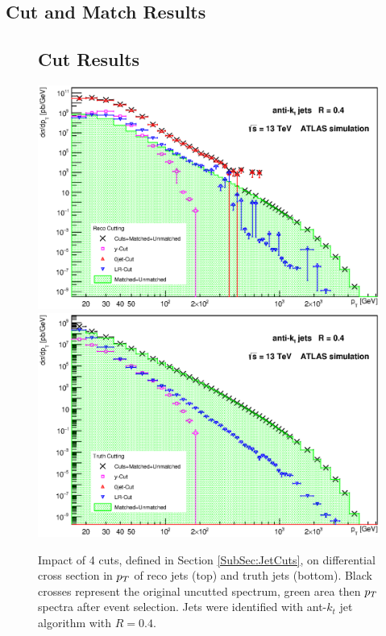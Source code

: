 \begin{appendices}

\chapter{Cut and Match Results}
\label{App:CutAndMatchingResults}

\newpage 

\begin{figure}[p]
\section{Cut Results}
\label{sec:CutResults}
  \centering
  \includegraphics[width=\textwidth]{Chapter3/SignalCutting.eps}
  \includegraphics[width=\textwidth]{Chapter3/TruthCutting.eps}
  \caption{Impact of 4 cuts, defined in Section \ref{SubSec:JetCuts}, on
  differential cross section in $p_{T}$ of reco jets (top) and truth jets
  (bottom). Black crosses represent the original uncutted spectrum, green area then
  $p_{T}$ spectra after event selection. Jets were identified with ant-$k_t$ jet
  algorithm with $R=0.4$.}
  \label{fig:Cutting}
\end{figure}


\end{appendices}

